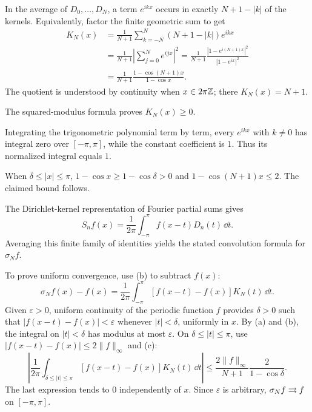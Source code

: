 \documentclass[11pt, oneside]{article}
\begin{document}
\begin{solution}
In the average of $D_0, \ldots, D_N$, a term $e^{ikx}$ occurs in exactly $N+1-|k|$ of the kernels. Equivalently, factor the finite geometric sum to get
\[
 \begin{aligned}
 K_N(x)&=\frac1{N+1}\sum_{k=-N}^N(N+1-|k|)e^{ikx}\\
 &=\frac1{N+1}\left|\sum_{j=0}^Ne^{ijx}\right|^2
 =\frac1{N+1}\frac{|1-e^{i(N+1)x}|^2}{|1-e^{ix}|^2}\\
 &=\frac1{N+1}\frac{1-\cos(N+1)x}{1-\cos x}.
 \end{aligned}
\]
The quotient is understood by continuity when $x\in2\pi\mathbb{Z}$; there $K_N(x)=N+1$.
\begin{exercisesubparts}
\item The squared-modulus formula proves $K_N(x)\ge0$.
\item Integrating the trigonometric polynomial term by term, every $e^{ikx}$ with $k\ne0$ has integral zero over $[-\pi, \pi]$, while the constant coefficient is $1$. Thus its normalized integral equals $1$.
\item When $\delta\le|x|\le\pi$, $1-\cos x\ge1-\cos\delta>0$ and $1-\cos(N+1)x\le2$. The claimed bound follows.
\end{exercisesubparts}
The Dirichlet-kernel representation of Fourier partial sums gives
\[
 S_nf(x)=\frac1{2\pi}\int_{-\pi}^\pi f(x-t)D_n(t)\,\dd t.
\]
Averaging this finite family of identities yields the stated convolution formula for $\sigma_Nf$.

To prove uniform convergence, use (b) to subtract $f(x)$:
\[
 \sigma_Nf(x)-f(x)=\frac1{2\pi}\int_{-\pi}^\pi
 [f(x-t)-f(x)]K_N(t)\,\dd t.
\]
Given $\varepsilon>0$, uniform continuity of the periodic function $f$ provides $\delta>0$ such that $|f(x-t)-f(x)|<\varepsilon$ whenever $|t|<\delta$, uniformly in $x$. By (a) and (b), the integral on $|t|<\delta$ has modulus at most $\varepsilon$. On $\delta\le|t|\le\pi$, use $|f(x-t)-f(x)|\le2\|f\|_\infty$ and (c):
\[
 \left|\frac1{2\pi}\int_{\delta\le|t|\le\pi}
 [f(x-t)-f(x)]K_N(t)\,\dd t\right|
 \le\frac{2\|f\|_\infty}{N+1}\frac2{1-\cos\delta}.
\]
The last expression tends to $0$ independently of $x$. Since $\varepsilon$ is arbitrary, $\sigma_Nf\rightrightarrows f$ on $[-\pi, \pi]$.
\end{solution}
\end{document}
